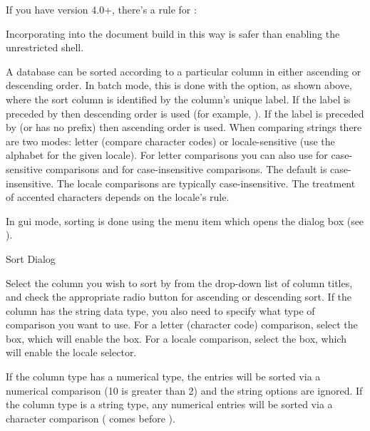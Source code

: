 If you have  version 4.0+, there's a rule for :
\begin{codebox}
\end{codebox}
Incorporating  into the document build in this way
is safer than enabling the unrestricted shell.

A database can be sorted according to a particular column
in either ascending or descending order. In batch mode, this is done
with the  option, as shown above, where the sort column is identified
by the column's unique label. If the label is preceded by \code{-} then
descending order is used (for example, ). If the label is preceded by \code{+} (or has
no prefix) then ascending order is used. When comparing strings there are 
two modes: letter (compare character codes) or locale-sensitive
(use the alphabet for the given locale).
For letter comparisons you 
can also use  for case-sensitive comparisons
and  for case-insensitive comparisons.
The default is case-insensitive. The locale comparisons are
typically case-insensitive. The treatment of accented characters depends
on the locale's rule.

In \gls{gui} mode, sorting is
done using the  menu item which opens
the  dialog box (see ).

 {%
 }
 {Sort Dialog}

Select the column you wish to sort by from the drop-down list of column
titles, and check the appropriate radio button for ascending or descending
sort. If the column has the string data type, you also need to specify
what type of comparison you want to use. For a letter (character code)
comparison, select the  box, which will enable
the  box. For a locale comparison,
select the  box, which will enable the
locale selector.

If the column type has a numerical type, the entries will be sorted via 
a numerical comparison (10 is greater than 2) and the string
options are ignored. If the column type is a string type,
any numerical entries will be sorted via a character comparison (
comes before ).

